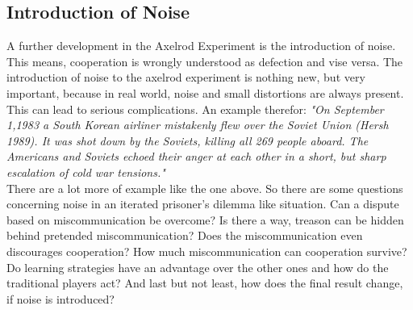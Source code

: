\subsection{Introduction of Noise}
A further development in the Axelrod Experiment is the introduction of noise. This means, cooperation is wrongly understood as defection and vise versa. The introduction of noise to the axelrod experiment is nothing new, but very important, because in real world, noise and small distortions are always present. This can lead to serious complications. An example therefor: \textit{"On September 1,1983 a South Korean airliner mistakenly
flew over the Soviet Union (Hersh 1989). It was shot down by the Soviets, killing all 269
people aboard. The Americans and Soviets echoed their anger at each other in a short,
but sharp escalation of cold war tensions."}\cite{wu}\\

There are a lot more of example like the one above. So there are some questions concerning noise in an iterated prisoner's dilemma like situation. Can a dispute based on miscommunication be overcome? Is there a way, treason can be hidden behind pretended miscommunication? Does the miscommunication even discourages cooperation? How much miscommunication can cooperation survive? Do learning strategies have an advantage over the other ones and how do the traditional players act? And last but not least, how does the final result change, if noise is introduced?